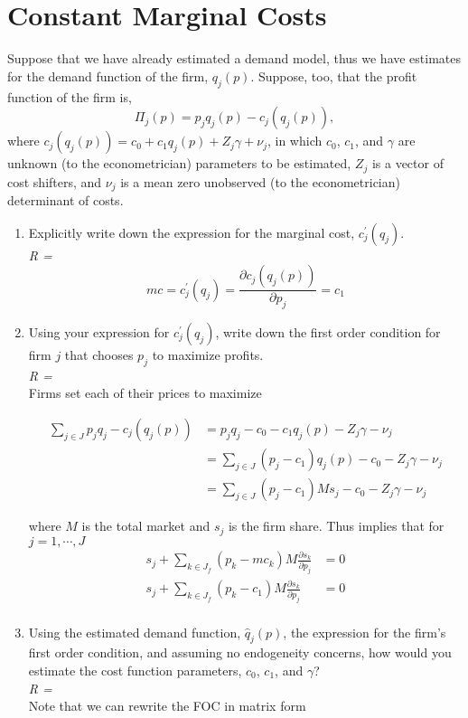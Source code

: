 \documentclass[english,12pt]{article}
\begin{document}
\section{Constant Marginal Costs} 
Suppose that we have already estimated a demand model, thus we have estimates for the demand function of the firm, $q_j(p)$. Suppose, too, that the profit function of the firm is,
\[ \Pi_j(p) = p_jq_j(p) - c_j\left(q_j(p)\right) , \]
where $c_j\left(q_j(p)\right) = c_0 + c_1q_j(p) + Z_j\gamma + \nu_j$, in which $c_0$, $c_1$, and $\gamma$ are unknown (to the econometrician) parameters to be estimated, $Z_j$ is a vector of cost shifters, and $\nu_j$ is a mean zero unobserved (to the econometrician) determinant of costs.
\begin{enumerate}
	\item Explicitly write down the expression for the marginal cost, 
	$c_j^\prime(q_j)$. \\
	\textit{R = }
	\[
mc = 	c_j^\prime (q_j) = \frac{\partial c_j\left(q_j(p)\right)}{ \partial p_j} = c_1 
	\]
	
	\item Using your expression for $c_j^\prime(q_j)$, write down the first order condition for firm $j$ that chooses $p_j$ to maximize profits.\\
\textit{R =} \\
Firms set each of their prices to maximize 

\begin{align*}
\sum_{j \in J} p_j q_j -c_j\left(q_j(p)\right) &= p_j q_j - c_0 - c_1q_j(p) - Z_j\gamma - \nu_j \\
& =  \sum_{j \in J} \left( p_j - c_1 \right) q_j(p) - c_0 -Z_j \gamma - \nu_j\\
& = \sum_{j \in J} \left( p_j - c_1 \right) M s_j - c_0 -Z_j \gamma - \nu_j
\end{align*}

where $M$ is the total market and $s_j$ is the firm share. Thus implies that for $j = 1, \cdots ,J$ 
\begin{align*}
s_j + \sum_{k \in J_f} (p_k - mc_k) M \frac{\partial s_k}{\partial p_j} &= 0 \\
s_j + \sum_{k \in J_f} (p_k - c_1) M \frac{\partial s_k}{\partial p_j} &= 0 \\
\end{align*}
	
	\item Using the estimated demand function, $\hat q_j(p)$, the expression for the firm's first order condition, and assuming no endogeneity concerns, how would you estimate the cost function parameters, $c_0$, $c_1$, and $\gamma$?\\
\textit{R = }\\
Note that we can rewrite the FOC in matrix form


\end{enumerate}
\end{document}
